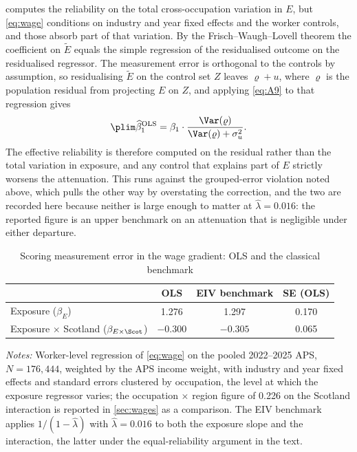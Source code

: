  computes the reliability on the total cross-occupation variation in $E$, but \cref{eq:wage} conditions on industry and year fixed effects and the worker controls, and those absorb part of that variation. By the Frisch--Waugh--Lovell theorem the coefficient on $\tilde{E}$ equals the simple regression of the residualised outcome on the residualised regressor. The measurement error is orthogonal to the controls by assumption, so residualising $\tilde{E}$ on the control set $Z$ leaves $\varrho + u$, where $\varrho$ is the population residual from projecting $E$ on $Z$, and applying \cref{eq:A9} to that regression gives
\begin{equation}\label{eq:eivpartial}
\plim \widehat{\beta}^{\mathrm{OLS}}_1
= \beta_1 \cdot \frac{\Var(\varrho)}{\Var(\varrho) + \sigma^2_u} .
\end{equation}
The effective reliability is therefore computed on the residual rather than the total variation in exposure, and any control that explains part of $E$ strictly worsens the attenuation. This runs against the grouped-error violation noted above, which pulls the other way by overstating the correction, and the two are recorded here because neither is large enough to matter at $\widehat{\lambda} = 0.016$: the reported figure is an upper benchmark on an attenuation that is negligible under either departure.

\begin{table}[h]
\centering
\caption{Scoring measurement error in the wage gradient: OLS and the classical benchmark}
\label{tab:eiv}
\small
\begin{tabular}{lccc}
\toprule
 & OLS & EIV benchmark & SE (OLS) \\
\midrule
Exposure ($\beta_E$) & 1.276 & 1.297 & 0.170 \\
Exposure $\times$ Scotland ($\beta_{E \times \Scot}$) &
  $-0.300$ & $-0.305$ & 0.065 \\
\bottomrule
\end{tabular}
\begin{minipage}{0.95\textwidth}
\vspace{0.4em}\footnotesize
\textit{Notes:} Worker-level regression of \cref{eq:wage} on the pooled 2022--2025 APS, $N = 176{,}444$, weighted by the APS income weight, with industry and year fixed effects and standard errors clustered by occupation, the level at which the exposure regressor varies; the occupation $\times$ region figure of 0.226 on the Scotland interaction is reported in \cref{sec:wages} as a comparison. The EIV benchmark applies $1/(1 - \widehat{\lambda})$ with $\widehat{\lambda} = 0.016$ to both the exposure slope and the interaction, the latter under the equal-reliability argument in the text.
\end{minipage}
\end{table}

